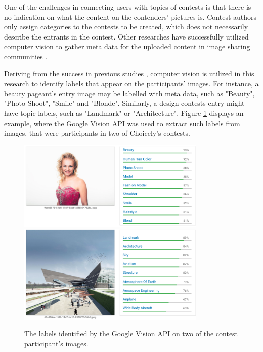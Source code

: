     One of the challenges in connecting users with topics of contests is that there is no indication on what the content on the contenders' pictures is. Contest authors only assign categories to the contests to be created, which does not necessarily describe the entrants in the contest. Other researches have successfully utilized computer vision to gather meta data for the uploaded content in image sharing communities \cite{bakhshi2014faces, hu2014we}. 
    
    Deriving from the success in previous studies \cite{hu2014we, farseev2015harvestingmultiplesources, han2016teensarefrommars, bakhshi2014faces}, computer vision is utilized in this research to identify labels that appear on the participants' images. For instance, a beauty pageant's entry image may be labelled with meta data, such as "Beauty", "Photo Shoot", "Smile" and "Blonde". Similarly, a design contests entry might have topic labels, such as "Landmark" or "Architecture". Figure \ref{google_vision_labels} displays an example, where the Google Vision API was used to extract such labels from images, that were participants in two of Choicely's contests.

    \begin{figure}[h] 
		\begin{center}
            \includegraphics[width=0.8\textwidth]{images/google_vision_labels.png}
            \includegraphics[width=0.8\textwidth]{images/google_vision_labels2.png}
			\caption{The labels identified by the Google Vision API on two of the contest participant's images.}
			\label{google_vision_labels}
		\end{center}
    \end{figure}

